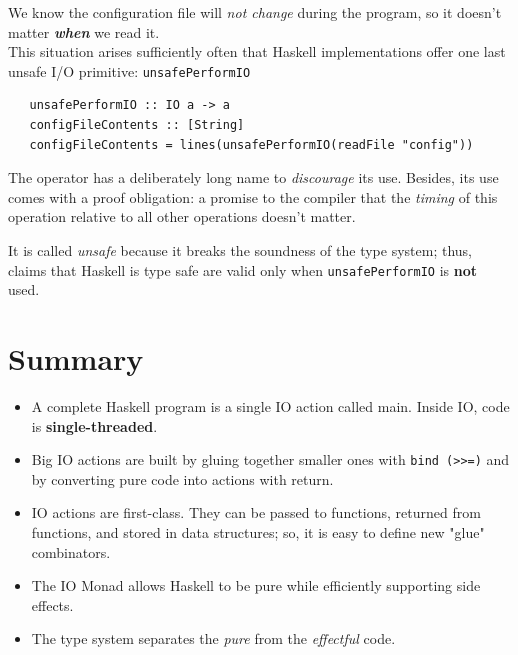 We know the configuration file will \textit{not change}
during the program, so it doesn’t matter \textit{\textbf{when}} we
read it.\\
This situation arises sufficiently often that Haskell
implementations offer one last unsafe I/O primitive:
\lstinline|unsafePerformIO|
\begin{lstlisting}
   unsafePerformIO :: IO a -> a
   configFileContents :: [String]
   configFileContents = lines(unsafePerformIO(readFile "config"))
\end{lstlisting}

The operator has a deliberately long name to
\textit{discourage} its use.
Besides, its use comes with a proof obligation:
a promise to the compiler that the \textit{timing} of this operation
relative to all other operations doesn’t matter.

It is called \textit{unsafe} because it breaks the soundness of the type system;
thus, claims that Haskell is type safe are valid only when \lstinline|unsafePerformIO| is \textbf{not} used.

\section{Summary}
\begin{itemize}
   \item A complete Haskell program is a single IO action called
   main. Inside IO, code is \textbf{single-threaded}.
   \item Big IO actions are built by gluing together smaller ones with
   \lstinline|bind (>>=)| and by converting pure code into actions with
   return.
   \item IO actions are first-class.
   They can be passed to functions, returned from functions, and
   stored in data structures; so, it is easy to define new "glue" combinators.
   \item The IO Monad allows Haskell to be pure while efficiently
   supporting side effects.
   \item The type system separates the \textit{pure} from the \textit{effectful} code.
\end{itemize}

